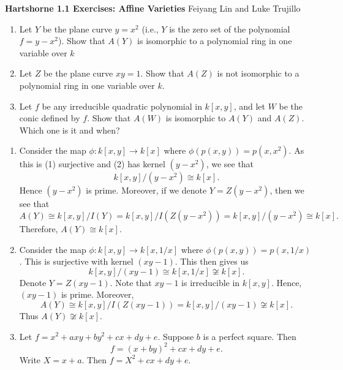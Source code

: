 \documentclass[10pt]{amsart}
\newcommand{\header}[2]{
    {\noindent
    {\Large \bf Hartshorne #1 Exercises: #2}
    \hfill 
    {\large Feiyang Lin and Luke Trujillo}
    \vspace{0.5cm}}
}
\begin{document}
\header{1.1}{Affine Varieties}
    
\begin{exercise}[1.1]
    \begin{enumerate}
        \item Let $Y$ be the plane curve $y = x^2$ (i.e., $Y$ is the zero set of 
        the polynomial $f = y - x^2$). Show that $A(Y)$ is isomorphic to a polynomial ring 
        in one variable over $k$

        \item Let $Z$ be the plane curve $xy = 1$. Show that $A(Z)$ is not isomorphic to 
        a polynomial ring in one variable over $k$. 
        
        \item Let $f$ be any irreducible quadratic polynomial in $k[x, y]$, and let 
        $W$ be the conic defined by $f$. Show that $A(W)$ is isomorphic to $A(Y)$ and $A(Z)$.
        Which one is it and when? 
    \end{enumerate}
\end{exercise}

\begin{solution}
    \begin{luke}
        \begin{enumerate}
            \item Consider the map $\phi: k[x, y] \to k[x]$ where $\phi(p(x, y)) = p(x, x^2)$. 
            As this is (1) surjective and (2) has kernel $(y - x^2)$, we see that 
            \[
                k[x, y]/(y - x^2) \cong k[x].
            \]
            Hence $(y - x^2)$ is prime. Moreover, if we denote 
            $Y = Z(y - x^2)$, then we see that
            \[
                A(Y) \cong k[x, y]/I(Y) = k[x, y]/I(Z(y - x^2)) = k[x, y]/(y - x^2)
                \cong k[x].
            \]
            Therefore, $A(Y) \cong k[x]$. 
    
            \item Consider the map 
            $\phi: k[x, y] \to k[x, 1/x]$ where $\phi(p(x, y)) = p(x, 1/x)$. This 
            is surjective with kernel $(xy - 1)$. This then gives us 
            \[
                k[x, y]/(xy - 1) \cong k[x, 1/x] \not\cong k[x].
            \]
            Denote $Y = Z(xy - 1)$. Note that $xy - 1$ is irreducible in $k[x, y]$. 
            Hence, $(xy - 1)$ is prime. Moreover, 
            \[
                A(Y) \cong k[x, y]/I(Z(xy - 1)) = k[x, y]/(xy - 1)\not\cong k[x].
            \]
            Thus $A(Y) \not\cong k[x]$. 
    
            \item Let $f = x^2 + axy + by^2 + cx + dy + e$. 
            Suppose $b$ is a perfect square. Then 
            \[
                f = (x + by)^2 + cx + dy + e.
            \]
            Write $X = x + a$. Then $f = X^2 + cx + dy +e$. 
        \end{enumerate}
    \end{luke}
\end{solution}
\end{document}

